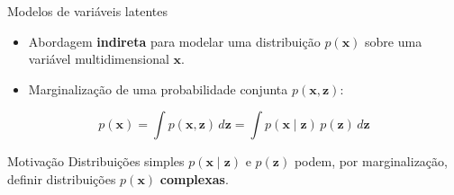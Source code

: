 \documentclass[aspectratio=169,xcolor=dvipsnames]{beamer}
\begin{document}
  \begin{frame}{Modelos de variáveis latentes}
    \begin{itemize}
      \item Abordagem \textbf{indireta} para modelar uma distribuição
      $p(\mathbf{x})$ sobre uma variável multidimensional $\mathbf{x}$.
      \item Marginalização de uma probabilidade conjunta $p(\mathbf{x}, \mathbf{z})$:
    \end{itemize}
    \vspace{0.3em}
    \[
      p(\mathbf{x}) = \int p(\mathbf{x}, \mathbf{z})\, d\mathbf{z} = \int p(\mathbf{x} \mid \mathbf{z})\, p(\mathbf{z})\, d\mathbf{z}
    \]
    \vspace{0.3em}
    \begin{block}{Motivação}
      Distribuições simples $p(\mathbf{x} \mid \mathbf{z})$ e $p(\mathbf{z})$ podem,
      por marginalização, definir distribuições $p(\mathbf{x})$
      \textbf{complexas}.
    \end{block}
  \end{frame}
\end{document}

